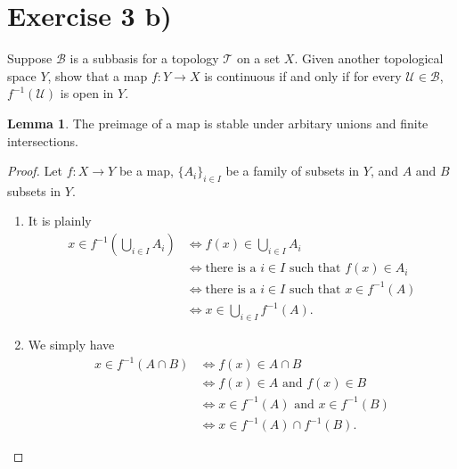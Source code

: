\documentclass[a4paper]{article}
\theoremstyle{definition}
\newtheorem*{lemma}{Lemma}
\begin{document}
\section*{Exercise 3 b)}
Suppose \(\mathcal{B}\) is a subbasis for a topology \(\mathcal{T}\) on a set \(X\). Given another topological space \(Y\), show that a map \(f: Y \longrightarrow X\) is continuous if and only if for every \(\mathcal{U} \in \mathcal{B}\), \(f^{-1}(\mathcal{U})\) is open in \(Y\).


\begin{lemma}
    The preimage of a map is stable under arbitary unions and finite intersections.
\end{lemma}
\begin{proof}
    Let \(f: X \longrightarrow Y\) be a map, \(\{A_i\}_{i \in I}\) be a family of subsets in \(Y\), and \(A\) and \(B\) subsets in \(Y\).
    \begin{enumerate}
        \item It is plainly
        \begin{align*}
            x \in f^{-1} \left(\bigcup_{i \in I}A_i\right) &\iff f(x) \in \bigcup_{i \in I}A_i \\
            &\iff \text{there is a \(i \in I\) such that } f(x) \in A_i \\
            &\iff \text{there is a \(i \in I\) such that } x \in f^{-1}(A) \\
            &\iff x \in \bigcup_{i \in I} f^{-1}(A) \text{.}
        \end{align*}
        \item We simply have
        \begin{align*}
            x \in f^{-1}(A \cap B) &\iff f(x) \in A \cap B \\
            &\iff f(x) \in A \text{ and } f(x) \in B\\
            &\iff x \in f^{-1}(A) \text{ and } x \in f^{-1}(B)\\
            &\iff x \in f^{-1}(A) \cap f^{-1}(B) \text{.}
        \end{align*}
    \end{enumerate}
\end{proof}
\end{document}
